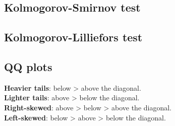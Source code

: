 \subsection{Kolmogorov-Smirnov test}
\subsection{Kolmogorov-Lilliefors test}
\subsection{QQ plots}
\textbf{Heavier tails}: below > above the diagonal.\\
\textbf{Lighter tails}: above > below the diagonal.\\
\textbf{Right-skewed}: above > below > above the diagonal.\\
\textbf{Left-skewed}: below > above > below the diagonal.\\
